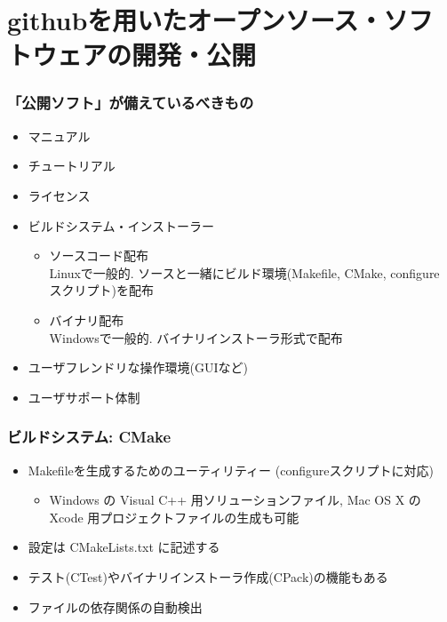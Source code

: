 \section{githubを用いたオープンソース・ソフトウェアの開発・公開}

\begin{frame}
  \frametitle{「公開ソフト」が備えているべきもの}
  \begin{itemize}
  \item マニュアル
  \item チュートリアル
  \item ライセンス
  \item ビルドシステム・インストーラー
    \begin{itemize}
    \item ソースコード配布 \\
      Linuxで一般的. ソースと一緒にビルド環境(Makefile, CMake, configure スクリプト)を配布
    \item バイナリ配布 \\
      Windowsで一般的. バイナリインストーラ形式で配布
    \end{itemize}
  \item ユーザフレンドリな操作環境(GUIなど)
  \item ユーザサポート体制
  \end{itemize}
\end{frame}

\begin{frame}
  \frametitle{ビルドシステム: CMake}
  \begin{itemize}
    \setlength{\itemsep}{1em}
  \item Makefileを生成するためのユーティリティー (configureスクリプトに対応)
    \begin{itemize}
    \item Windows の Visual C++ 用ソリューションファイル, Mac OS X の Xcode 用プロジェクトファイルの生成も可能
    \end{itemize}
  \item 設定は CMakeLists.txt に記述する
  \item テスト(CTest)やバイナリインストーラ作成(CPack)の機能もある
  \item ファイルの依存関係の自動検出
  \end{itemize}
\end{frame}

